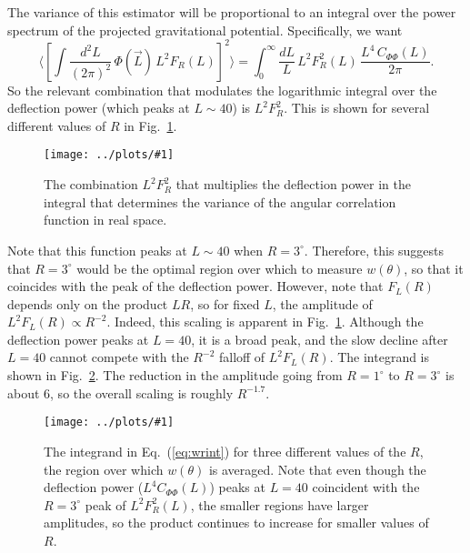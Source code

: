 \documentclass[prd,amsmath,amssymb,floatfix,superscriptaddress,nofootinbib]{revtex4-1}
\def\be{\begin{equation}}
\def\ee{\end{equation}}
\newcommand{\ec}[1]{Eq.~(\ref{eq:#1})}
\newcommand{\eql}[1]{\label{eq:#1}}
\newcommand{\rf}[1]{\ref{fig:#1}}
\newcommand{\sfigg}[2]{
\texttt{[image: ../plots/\#1]}
        }
\newcommand{\Spng}[2]{
   \begin{figure}[thbp]
   \begin{center}
    \sfigg{../plots/#1.png}{.7\columnwidth}
    \caption{{\small #2}}
    \label{fig:#1}
     \end{center}
   \end{figure}
}
\begin{document}
The variance of this estimator will be proportional to an integral over the power spectrum of the projected gravitational potential. Specifically,
we want
\be
\langle  \left[\int \frac{d^2L}{(2\pi)^2}\, \Phi(\vec L)\, L^2 F_R(L)\right]^2  \rangle
=
\int_0^\infty \frac{dL}{L}\, L^2F_R^2(L) \, \frac{L^4\, C_{\Phi\Phi}(L)}{2\pi}
.\eql{wrint}\ee
So the relevant combination that modulates the logarithmic integral over the deflection power (which peaks at $L\sim 40$) is $L^2F_R^2$. This is shown for several different values of $R$ in Fig.~\rf{mrsq}.
\Spng{mrsq}{The combination $L^2F_R^2$ that multiplies the deflection power in the integral that determines the variance of the angular correlation function in real space.} 
Note that this function peaks at $L\sim40$ when $R=3^\circ$. Therefore, this suggests that $R=3^\circ$ would be the optimal region over which to measure $w(\theta)$, so that it coincides with the peak of the deflection power. However, note that $F_L(R)$ depends only on the product $LR$, so for fixed $L$, the amplitude of $L^2F_L(R)\propto R^{-2}$. Indeed, this scaling is apparent in Fig.~\rf{mrsq}. Although the deflection power peaks at $L=40$, it is a broad peak, and the slow decline after $L=40$ cannot compete with the $R^{-2}$ falloff of $L^2F_L(R)$. The integrand is shown in Fig.~\rf{wrint}. The reduction in the amplitude going from $R=1^\circ$ to $R=3^\circ$ is about 6, so the overall scaling is roughly $R^{-1.7}$.
\Spng{wrint}{The integrand in \ec{wrint} for three different values of the $R$, the region over which $w(\theta)$ is averaged. Note that even though the deflection power ($L^4C_{\Phi\Phi}(L)$) peaks at $L=40$ coincident with the $R=3^\circ$ peak of $L^2F_R^2(L)$, the smaller regions have larger amplitudes, so the product continues to increase for smaller values of $R$.}
\end{document}
